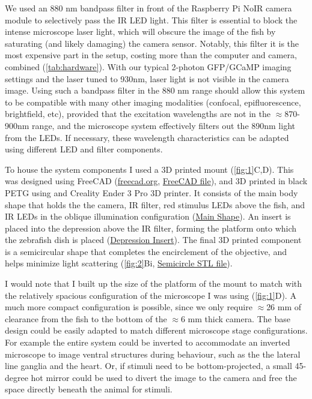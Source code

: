 \documentclass[9pt,lineno]{RandlettLab_elife}
\begin{document}
We used an 880 nm bandpass filter in front of the Raspberry Pi NoIR camera module to selectively pass the IR LED light. This filter is essential to block the intense microscope laser light, which will obscure the image of the fish by saturating (and likely damaging) the camera sensor. Notably, this filter it is the most expensive part in the setup, costing more than the computer and camera, combined (\autoref{tab:hardware}). With our typical 2-photon GFP/GCaMP imaging settings and the laser tuned to 930nm, laser light is not visible in the camera image. Using such a bandpass filter in the 880 nm range should allow this system to be compatible with many other imaging modalities (confocal, epifluorescence, brightfield, etc), provided that the excitation wavelengths are not in the $\approx$870-900nm range, and the microscope system effectively filters out the 890nm light from the LEDs. If necessary, these wavelength characteristics can be adapted using different LED and filter components. 

To house the system components I used a 3D printed mount (\autoref{fig:1}C,D). This was designed using FreeCAD  (\href{https://www.freecad.org/}{freecad.org}, \href{https://github.com/owenrandlett/pi_tailtrack/blob/main/3d_printing/pi_tailtrack_mount.FCStd}{FreeCAD file}), and 3D printed in black PETG using and Creality Ender 3 Pro 3D printer. It consists of the main body shape that holds the the camera, IR filter, red stimulus LEDs above the fish, and IR LEDs in the oblique illumination configuration (\href{https://github.com/owenrandlett/pi_tailtrack/blob/main/3d_printing/pi_tailtrack_mount_MainShape.stl}{Main Shape}). An insert is placed into the depression above the IR filter, forming the platform onto which the zebrafish dish is placed (\href{https://github.com/owenrandlett/pi_tailtrack/blob/main/3d_printing/pi_tailtrack_mount_CameraDepressionInsert.stl}{Depression Insert}). The final 3D printed component is a semicircular shape that completes the encirclement of the objective, and helps minimize light scattering (\autoref{fig:2}Bi, \href{https://github.com/owenrandlett/pi_tailtrack/blob/main/3d_printing/pi_tailtrack_mount_Semicircle.stl}{Semicircle STL file}).  

I would note that I built up the size of the platform of the mount to match with the relatively spacious configuration of the microscope I was using (\autoref{fig:1}D). A much more compact configuration is possible, since we only require $\approx$26 mm of clearance from the fish to the bottom of the $\approx$6 mm thick camera. The base design could be easily adapted to match different microscope stage configurations. For example the entire system could be inverted to accommodate an inverted microscope to image ventral structures during behaviour, such as the the lateral line ganglia and the heart. Or, if stimuli need to be bottom-projected, a small 45-degree hot mirror could be used to divert the image to the camera and free the space directly beneath the animal for stimuli. 
\end{document}
